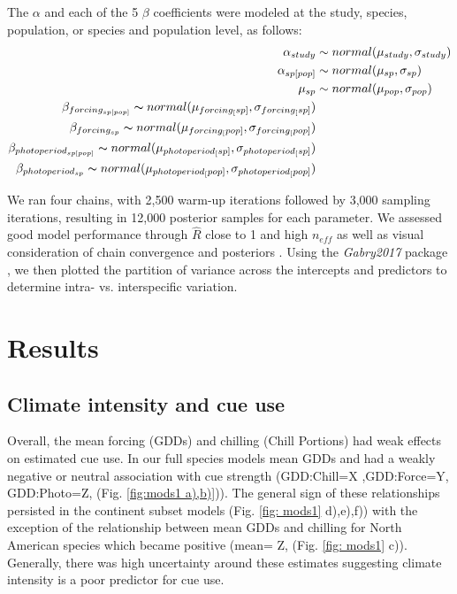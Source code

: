 \documentclass[12pt]{article}\usepackage[]{graphicx}\usepackage[]{color}
\begin{document}
\noindent The $\alpha$ and each of the 5 $\beta$ coefficients were modeled at the study, species, population, or species and population level, as follows:
\begin{align*}
\alpha_{study} & \sim normal(\mu_{study}, \sigma_{study}) \\
\alpha_{sp[pop]} & \sim normal(\mu_{sp}, \sigma_{sp}) \\
\mu_{sp} & \sim normal(\mu_{pop}, \sigma_{pop}) \\
\beta_{forcing_{sp[pop]}} \thicksim normal(\mu_{forcing_[sp]}, \sigma_{forcing_[sp]}) \\
\beta_{forcing_{sp}} \thicksim normal(\mu_{forcing_[pop]}, \sigma_{forcing_[pop]}) \\
\beta_{photoperiod_{sp[pop]}} \thicksim normal(\mu_{photoperiod_[sp]}, \sigma_{photoperiod_[sp]}) \\
\beta_{photoperiod_{sp}} \thicksim normal(\mu_{photoperiod_[pop]}, \sigma_{photoperiod_[pop]}) \\
\end{align*}

We ran four chains, with 2,500 warm-up iterations followed by 3,000 sampling iterations, resulting in 12,000 posterior samples for each parameter. We assessed good model performance through $\hat{R}$ close to 1 and high $n_{eff}$ as well as visual consideration of chain convergence and posteriors \citep{Gelman2006}. Using the \textit{Gabry2017} package \citep{bayesplot}, we then plotted the partition of variance across the intercepts and predictors to determine intra- vs. interspecific variation.  



\section*{Results}
\subsection*{Climate intensity and cue use}
Overall, the mean forcing (GDDs) and chilling (Chill Portions) had weak effects on estimated cue use. 
In our full species models mean GDDs and had a weakly negative or neutral association with cue strength (GDD:Chill=X ,GDD:Force=Y, GDD:Photo=Z, (Fig. \ref{fig:mods1 a),b)})). The general sign of these relationships persisted in the continent subset models (Fig. \ref{fig: mods1} d),e),f)) with the exception of the relationship between mean GDDs and chilling for North American species which became positive (mean= Z, (Fig. \ref{fig: mods1} c)). Generally, there was high uncertainty around these estimates suggesting climate intensity is a poor predictor for cue use. 
\end{document}
